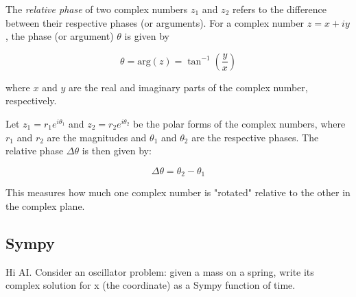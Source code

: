 \begin{airesult}
The \textit{relative phase} of two complex numbers \( z_1 \) and \( z_2 \) refers to the difference
between their respective phases (or arguments). For a complex number \( z = x + iy \), the phase (or
argument) \(\theta\) is given by

\[
\theta = \text{arg}(z) = \tan^{-1}\left(\frac{y}{x}\right)
\]

where \( x \) and \( y \) are the real and imaginary parts of the complex number, respectively.

\vsp

Let \( z_1 = r_1 e^{i\theta_1} \) and \( z_2 = r_2 e^{i\theta_2} \) be the polar forms of the
complex numbers, where \( r_1 \) and \( r_2 \) are the magnitudes and \( \theta_1 \) and \( \theta_2
\) are the respective phases. The relative phase \(\Delta \theta\) is then given by:

\[
\Delta \theta = \theta_2 - \theta_1
\]

\vsp

This measures how much one complex number is "rotated" relative to the other in the complex plane.
\end{airesult}


\subsection{Sympy}

\begin{ai}
Hi AI. Consider an oscillator problem: given a mass on a spring, write its complex solution for x
(the coordinate) as a Sympy function of time.
\end{ai}

